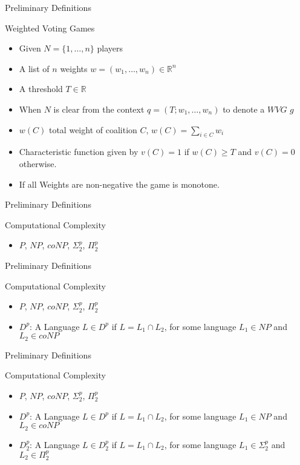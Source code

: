 \documentclass{beamer}
\begin{document}
\begin{frame}[fragile]{Preliminary Definitions}
  \begin{block}{Weighted Voting Games}
    \begin{itemize}
      \item Given $N = \{1,\dots,n\}$ players
      \item A list of $n$ weights $w = (w_1, \dots, w_n) \in \mathbb{R}^n$
      \item A threshold $T \in \mathbb{R}$
      \item When $N$ is clear from the context $q = (T; w_1, \dots, w_n)$ to denote a $WVG$ $g$
      \item $w(C)$ total weight of coalition $C$, $w(C) = \sum_{i \in C} w_i$ 
      \item Characteristic function given by $v(C) = 1$ if $w(C) \geq T$ and $v(C) = 0$ otherwise.
      \item If all Weights are non-negative the game is monotone.
    \end{itemize}
  \end{block}
\end{frame}

\begin{frame}[fragile]{Preliminary Definitions}
  \begin{block}{Computational Complexity}
    \begin{itemize}
      \item $P$, $NP$, $coNP$, $\Sigma_2^p$, $\Pi_2^p$
    \end{itemize}
  \end{block}
\end{frame}

\begin{frame}[fragile]{Preliminary Definitions}
  \begin{block}{Computational Complexity}
    \begin{itemize}
      \item $P$, $NP$, $coNP$, $\Sigma_2^p$, $\Pi_2^p$
      \item $D^p$: A Language $L \in D^p$ if $L = L_1 \cap L_2$, for some language $L_1 \in NP$ and $L_2 \in coNP$
    \end{itemize}
  \end{block}
\end{frame}


\begin{frame}[fragile]{Preliminary Definitions}
  \begin{block}{Computational Complexity}
    \begin{itemize}
      \item $P$, $NP$, $coNP$, $\Sigma_2^p$, $\Pi_2^p$
      \item $D^p$: A Language $L \in D^p$ if $L = L_1 \cap L_2$, for some language $L_1 \in NP$ and $L_2 \in coNP$
      \item $D_2^p$: A Language $L \in D_2^p$ if $L = L_1 \cap L_2$, for some language $L_1 \in \Sigma_2^p$ and $L_2 \in \Pi_2^p$
    \end{itemize}
  \end{block}
\end{frame}
\end{document}

